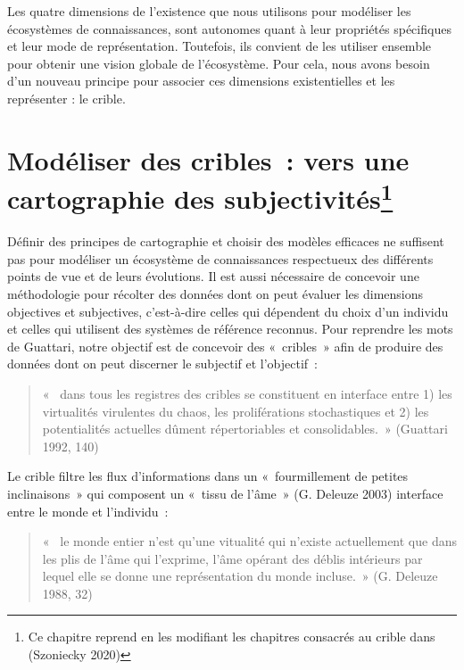 \documentclass[
  letterpaper,
  DIV=11,
  numbers=noendperiod]{scrreprt}
\begin{document}
Les quatre dimensions de l'existence que nous utilisons pour modéliser
les écosystèmes de connaissances, sont autonomes quant à leur propriétés
spécifiques et leur mode de représentation. Toutefois, ils convient de
les utiliser ensemble pour obtenir une vision globale de l'écosystème.
Pour cela, nous avons besoin d'un nouveau principe pour associer ces
dimensions existentielles et les représenter : le crible.

\hypertarget{sec-modeliserCrible}{%
\section[Modéliser des cribles~: vers une cartographie des
subjectivités]{\texorpdfstring{Modéliser des cribles~: vers une
cartographie des
subjectivités\footnote{Ce chapitre reprend en les modifiant les
  chapitres consacrés au crible dans (Szoniecky 2020)}}{Modéliser des cribles~: vers une cartographie des subjectivités}}\label{sec-modeliserCrible}}

Définir des principes de cartographie et choisir des modèles efficaces
ne suffisent pas pour modéliser un écosystème de connaissances
respectueux des différents points de vue et de leurs évolutions. Il est
aussi nécessaire de concevoir une méthodologie pour récolter des données
dont on peut évaluer les dimensions objectives et subjectives,
c'est-à-dire celles qui dépendent du choix d'un individu et celles qui
utilisent des systèmes de référence reconnus. Pour reprendre les mots de
Guattari, notre objectif est de concevoir des «~cribles~» afin de
produire des données dont on peut discerner le subjectif et l'objectif~:

\begin{quote}
«~ dans tous les registres des cribles se constituent en interface entre
1) les virtualités virulentes du chaos, les proliférations stochastiques
et 2) les potentialités actuelles dûment répertoriables et
consolidables.~» (Guattari 1992, 140)
\end{quote}

Le crible filtre les flux d'informations dans un «~fourmillement de
petites inclinaisons~» qui composent un «~tissu de l'âme~» (G. Deleuze
2003) interface entre le monde et l'individu~:

\begin{quote}
«~ le monde entier n'est qu'une vitualité qui n'existe actuellement que
dans les plis de l'âme qui l'exprime, l'âme opérant des déblis
intérieurs par lequel elle se donne une représentation du monde
incluse.~» (G. Deleuze 1988, 32)
\end{quote}
\end{document}
